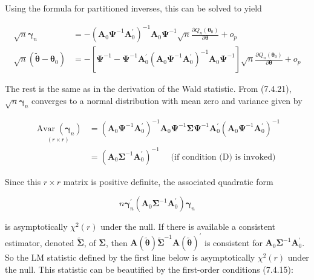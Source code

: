 \documentclass[10pt]{article}
\begin{document}
Using the formula for partitioned inverses, this can be solved to yield


\begin{align*}
\sqrt{n} \boldsymbol{\gamma}_{n} & =-\left(\mathbf{A}_{0} \boldsymbol{\Psi}^{-1} \mathbf{A}_{0}^{\prime}\right)^{-1} \mathbf{A}_{0} \boldsymbol{\Psi}^{-1} \sqrt{n} \frac{\partial Q_{n}\left(\boldsymbol{\theta}_{0}\right)}{\partial \boldsymbol{\theta}}+o_{p}  \tag{7.4.21}\\
\sqrt{n}\left(\tilde{\boldsymbol{\theta}}-\boldsymbol{\theta}_{0}\right) & =-\left[\boldsymbol{\Psi}^{-1}-\boldsymbol{\Psi}^{-1} \mathbf{A}_{0}^{\prime}\left(\mathbf{A}_{0} \boldsymbol{\Psi}^{-1} \mathbf{A}_{0}^{\prime}\right)^{-1} \mathbf{A}_{0} \boldsymbol{\Psi}^{-1}\right] \sqrt{n} \frac{\partial Q_{n}\left(\boldsymbol{\theta}_{0}\right)}{\partial \boldsymbol{\theta}}+o_{p} \tag{7.4.22}
\end{align*}


The rest is the same as in the derivation of the Wald statistic. From (7.4.21), $\sqrt{n} \boldsymbol{\gamma}_{n}$ converges to a normal distribution with mean zero and variance given by


\begin{align*}
\underset{(r \times r)}{\operatorname{Avar}\left(\boldsymbol{\gamma}_{n}\right)} & =\left(\mathbf{A}_{0} \boldsymbol{\Psi}^{-1} \mathbf{A}_{0}^{\prime}\right)^{-1} \mathbf{A}_{0} \boldsymbol{\Psi}^{-1} \boldsymbol{\Sigma} \boldsymbol{\Psi}^{-1} \mathbf{A}_{0}^{\prime}\left(\mathbf{A}_{0} \boldsymbol{\Psi}^{-1} \mathbf{A}_{0}^{\prime}\right)^{-1} \\
& =\left(\mathbf{A}_{0} \boldsymbol{\Sigma}^{-1} \mathbf{A}_{0}^{\prime}\right)^{-1} \quad \text { (if condition (D) is invoked) } \tag{7.4.23}
\end{align*}


Since this $r \times r$ matrix is positive definite, the associated quadratic form


\begin{equation*}
n \boldsymbol{\gamma}_{n}^{\prime}\left(\mathbf{A}_{0} \boldsymbol{\Sigma}^{-1} \mathbf{A}_{0}^{\prime}\right) \boldsymbol{\gamma}_{n} \tag{7.4.24}
\end{equation*}


is asymptotically $\chi^{2}(r)$ under the null. If there is available a consistent estimator, denoted $\tilde{\mathbf{\Sigma}}$, of $\boldsymbol{\Sigma}$, then $\mathbf{A}(\tilde{\boldsymbol{\theta}}) \tilde{\mathbf{\Sigma}}^{-1} \mathbf{A}(\tilde{\boldsymbol{\theta}})^{\prime}$ is consistent for $\mathbf{A}_{0} \boldsymbol{\Sigma}^{-1} \mathbf{A}_{0}^{\prime}$. So the LM statistic defined by the first line below is asymptotically $\chi^{2}(r)$ under the null. This statistic can be beautified by the first-order conditions (7.4.15):
\end{document}

